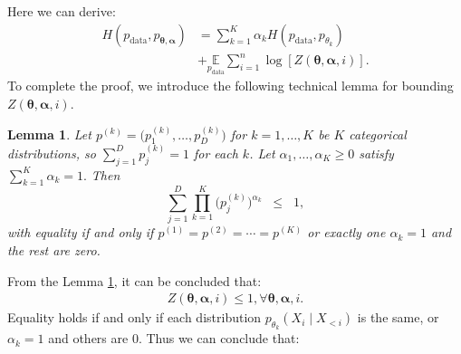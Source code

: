 \documentclass[11pt]{article}
\newtheorem{lemma}{Lemma}
\begin{document}
Here we can derive:
\begin{equation}
    \begin{array}{cc}
     H(p_{\text{data}}, p_{\boldsymbol{\theta}, \boldsymbol{\alpha}}) &=  \sum_{k = 1}^K \alpha_k H(p_{\text{data}},p_{\theta_k})\\
     &+\underset{p_{\text{data}}}{\mathbb{E}} \displaystyle\sum_{i=1}^{n} \log \left[Z(\boldsymbol{\theta}, \boldsymbol{\alpha},i)\right].
\end{array}
\end{equation}
To complete the proof, we introduce the following technical lemma for bounding $Z(\boldsymbol{\theta}, \boldsymbol{\alpha},i)$. 
\begin{lemma}
    \label{lemma:proof_inequality}
    Let $p^{(k)} = \bigl(p^{(k)}_1, \ldots, p^{(k)}_D\bigr)$ for $k=1,\dots,K$ 
    be $K$ categorical distributions, so $\sum_{j=1}^D p^{(k)}_j = 1$ for each $k$. 
    Let $\alpha_1,\dots,\alpha_K \ge 0$ satisfy $\sum_{k=1}^K \alpha_k = 1.$ 
    Then
    \[
    \sum_{j=1}^D 
    \prod_{k=1}^K \bigl(p^{(k)}_j\bigr)^{\alpha_k}
    \;\;\le\;\; 1,
    \]
    with equality if and only if $p^{(1)} = p^{(2)} = \cdots = p^{(K)}$ 
    or exactly one $\alpha_k=1$ and the rest are zero.
\end{lemma}
From the Lemma \ref{lemma:proof_inequality}, it can be concluded that:
\begin{align}
    Z(\boldsymbol{\theta}, \boldsymbol{\alpha},i) \leq  1, \forall \boldsymbol{\theta}, \boldsymbol{\alpha},i.
\end{align}
Equality holds if and only if  each distribution $p_{\theta_k}(X_i \mid X_{<i})$ is the same, or $\alpha_k = 1$ and others are 0.
Thus we can conclude that:
\end{document}

